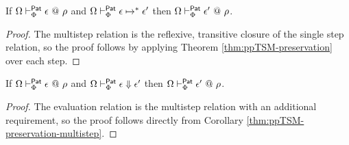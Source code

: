 \begin{corollary}
\label{thm:ppTSM-preservation-multistep}
If $\Omega \vdash_{\Phi}^{\mathsf{Pat}} \epsilon ~@~ \rho$ and $\Omega \vdash_{\Phi}^\mathsf{Pat} \epsilon \mapsto^{*} \epsilon'$ then $\Omega \vdash_{\Phi}^{\mathsf{Pat}} \epsilon' ~@~ \rho$.
\end{corollary}
\begin{proof} The multistep relation is the reflexive, transitive closure of the single step relation, so the proof follows by applying Theorem \ref{thm:ppTSM-preservation} over each step. \end{proof}

\begin{corollary}
\label{thm:ppTSM-preservation-evaluation}
If $\Omega \vdash_{\Phi}^{\mathsf{Pat}} \epsilon ~@~ \rho$ and $\Omega \vdash_{\Phi}^\mathsf{Pat} \epsilon \Downarrow \epsilon'$ then $\Omega \vdash_{\Phi}^{\mathsf{Pat}} \epsilon' ~@~ \rho$.
\end{corollary}
\begin{proof} The evaluation relation is the multistep relation with an additional requirement, so the proof follows directly from Corollary \ref{thm:ppTSM-preservation-multistep}. \end{proof}

